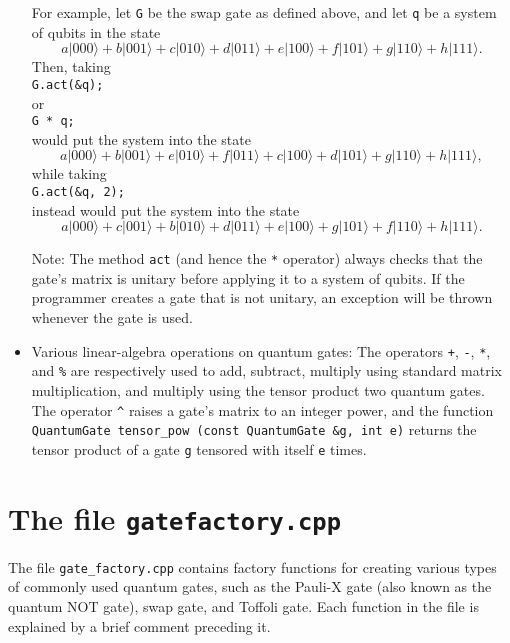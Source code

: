 \documentclass{article}
\begin{document}
\begin{itemize}
For example, let \verb~G~ be the swap gate as defined above, and let \verb~q~ be a system of qubits in the state 
\[ a|000\rangle + b|001\rangle + c|010\rangle + d|011\rangle + e|100\rangle + f|101\rangle + g|110\rangle + h|111\rangle .\] 
Then, taking \\
\hspace*{1em} \verb~G.act(&q);~\\
or\\
\hspace*{1em} \verb~G * q;~\\
would put the system into the state
\[ a|000\rangle + b|001\rangle + e|010\rangle + f|011\rangle + c|100\rangle + d|101\rangle + g|110\rangle + h|111\rangle, \] 
while taking \\
\hspace*{1em} \verb~G.act(&q, 2);~\\
instead would put the system into the state
\[ a|000\rangle + c|001\rangle + b|010\rangle + d|011\rangle + e|100\rangle + g|101\rangle + f|110\rangle + h|111\rangle .\] 

Note: The method \verb~act~ (and hence the \verb~*~ operator) always checks that the gate's matrix is unitary before applying it to a system of qubits. If the programmer creates a gate that is not unitary, an exception will be thrown whenever the gate is used. 

\item Various linear-algebra operations on quantum gates: The operators \verb~+~, \verb~-~, \verb~*~, and \verb~%~ are respectively used to add, subtract, multiply using standard matrix multiplication, and multiply using the tensor product two quantum gates. The operator \verb~^~ raises a gate's matrix to an integer power, and the function \verb~QuantumGate tensor_pow (const QuantumGate &g, int e)~ returns the tensor product of a gate \verb~g~ tensored with itself \verb~e~ times. 

\end{itemize} 


\section{The file \texttt{gate\textunderscore{}factory.cpp}} 

The file \verb~gate_factory.cpp~ contains factory functions for creating various types of commonly used quantum gates, such as the Pauli-X gate (also known as the quantum NOT gate), swap gate, and Toffoli gate. Each function in the file is explained by a brief comment preceding it. 
\end{document}
